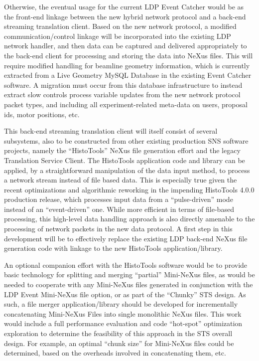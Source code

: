 Otherwise, the eventual usage for the current LDP Event Catcher
would be as the front-end linkage between the new hybrid network protocol
and a back-end streaming translation client.
Based on the new network protocol,
a modified communication/control linkage will be incorporated
into the existing LDP network handler,
and then data can be captured and delivered appropriately
to the back-end client for processing and storing the data into NeXus files.
This will require modified handling for beamline geometry information,
which is currently extracted from a Live Geometry MySQL Database
in the existing Event Catcher software.
A migration must occur from this database infrastructure
to instead extract slow controls process variable updates
from the new network protocol packet types,
and including all experiment-related meta-data on
users, proposal ids, motor positions, etc.

This back-end streaming translation client
will itself consist of several subsystems,
also to be constructed from other existing production SNS software projects,
namely the ``HistoTools'' NeXus file generation effort
and the legacy Translation Service Client.
The HistoTools application code and library can be applied,
by a straightforward manipulation of the data input method,
to process a network stream instead of file based data.
This is especially true given the recent optimizations and
algorithmic reworking in the impending HistoTools 4.0.0 production release,
which processes input data from a ``pulse-driven'' mode
instead of an ``event-driven'' one.
While more efficient in terms of file-based processing,
this high-level data handling approach is also directly amenable
to the processing of network packets in the new data protocol.
A first step in this development will be to effectively replace
the existing LDP back-end NeXus file generation code
with linkage to the new HistoTools application/library.

An optional companion effort with the HistoTools software
would be to provide basic technology for
splitting and merging ``partial'' Mini-NeXus files,
as would be needed to cooperate with any Mini-NeXus files
generated in conjunction with the LDP Event Mini-NeXus file option,
or as part of the ``Chunky'' STS design.
As such, a file merger application/library should be developed
for incrementally concatenating Mini-NeXus Files into
single monolithic NeXus files.
This work would include a full performance evaluation
and code ``hot-spot'' optimization exploration
to determine the feasibility of this approach in the STS overall design.
For example, an optimal ``chunk size'' for Mini-NeXus files
could be determined,
based on the overheads involved in concatenating them, etc.

